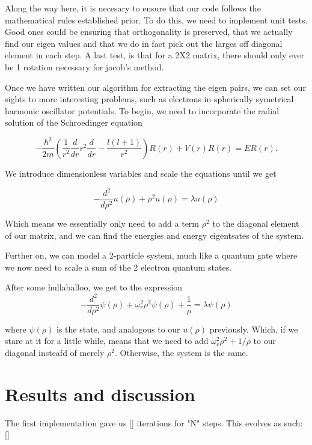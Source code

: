 \documentclass[10pt, twocolumn]{article}
\begin{document}
Along the way here, it is necesary to ensure that our code follows the mathematical rules 
established prior. To do this, we need to implement unit tests. Good ones could be ensuring 
that orthogonality is preserved, that we actually find our eigen values and that we do in fact
pick out the larges off diagonal element in each step. A last test, is that for a 2X2 matrix, 
there should only ever be 1 rotation necessary for jacob's method. 

Once we have written our algorithm for extracting the eigen pairs, we can set our sights to 
more interesting problems, such as electrons in spherically symetrical harmonic oscillator 
potentials. To begin, we need to incorporate the radial solution of the Schroedinger equation

\begin{equation*}
  -\frac{\hbar^2}{2 m} \left ( \frac{1}{r^2} \frac{d}{dr} r^2
  \frac{d}{dr} - \frac{l (l + 1)}{r^2} \right )R(r) 
     + V(r) R(r) = E R(r).
\end{equation*}

We introduce dimensionless variables and scale the equations until we get 

\begin{equation*}
  -\frac{d^2}{d\rho^2} u(\rho) + \rho^2u(\rho)  = \lambda u(\rho) 
\end{equation*}

Which means we essentially only need to add a term $\rho^2$ to the diagonal element of our 
matrix, and we can find the energies and energy eigentsates of the system. 

Further on, we can model a 2-particle system, much like a quantum gate %
where we now need to scale a sum of the 2 electron quantum states. 

After some hullaballoo, we get to the expression 
\begin{equation*}
  -\frac{d^2}{d\rho^2} \psi(\rho) + \omega_r^2\rho^2\psi(\rho) +\frac{1}{\rho} = \lambda \psi(\rho)
\end{equation*}

where  $\psi(\rho)$ is the state, and analogous to our $u(\rho)$ previously. Which, if we stare at it for a little
while, means that we need to add $\omega_r^2\rho^2+1/\rho$ to our diagonal insteafd of merely $\rho^2$. 
Otherwise, the system is the same. 

\section{Results and discussion}
The first implementation gave us [] iterations for "N" steps. This evolves as such: []
\end{document}
